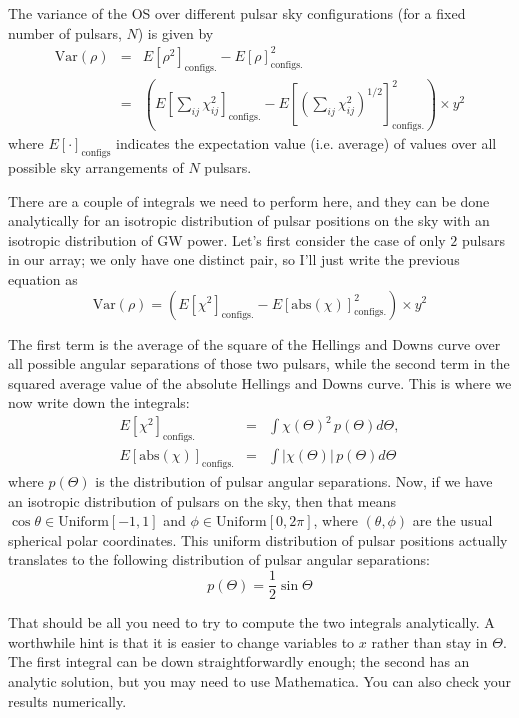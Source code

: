 \documentclass[12pt,letterpaper]{article}
\begin{document}
The variance of the OS over different pulsar sky configurations (for a fixed number of pulsars, $N$) is given by
%
\begin{eqnarray}
\mathrm{Var}(\rho) &=& E\left[\rho^2\right]_\mathrm{configs.} - E\left[\rho\right]^2_\mathrm{configs.} \nonumber\\
&=& \left(E\left[\sum_{ij} \chi_{ij}^2\right]_\mathrm{configs.} - E\left[\left(\sum_{ij} \chi_{ij}^2\right)^{1/2}\right]^2_\mathrm{configs.}\right) \times y^2
\end{eqnarray}
%
where $E[\cdot]_\mathrm{configs}$ indicates the expectation value (i.e. average) of values over all possible sky arrangements of $N$ pulsars. 

There are a couple of integrals we need to perform here, and they can be done analytically for an isotropic distribution of pulsar positions on the sky with an isotropic distribution of GW power. Let's first consider the case of only $2$ pulsars in our array; we only have one distinct pair, so I'll just write the previous equation as
%
\begin{equation}
\mathrm{Var}(\rho) = (E[\chi^2]_\mathrm{configs.} - E[\mathrm{abs}(\chi)]^2_\mathrm{configs.}) \times y^2
\end{equation}

The first term is the average of the square of the Hellings and Downs curve over all possible angular separations of those two pulsars, while the second term in the squared average value of the absolute Hellings and Downs curve. This is where we now write down the integrals:
%
\begin{eqnarray}
E[\chi^2]_\mathrm{configs.} &=& \int \chi(\Theta)^2 \, p(\Theta)d\Theta, \nonumber\\
E[\mathrm{abs}(\chi)]_\mathrm{configs.} &=& \int | \chi(\Theta) | \, p(\Theta)d\Theta
\end{eqnarray}
%
where $p(\Theta)$ is the distribution of pulsar angular separations. Now, if we have an isotropic distribution of pulsars on the sky, then that means $\cos\theta \in \mathrm{Uniform}[-1,1]$ and $\phi \in \mathrm{Uniform}[0,2\pi]$, where $(\theta,\phi)$ are the usual spherical polar coordinates. This uniform distribution of pulsar positions actually translates to the following distribution of pulsar angular separations:
%
\begin{equation}
p(\Theta) = \frac{1}{2}\sin\Theta
\end{equation}

That should be all you need to try to compute the two integrals analytically. A worthwhile hint is that it is easier to change variables to $x$ rather than stay in $\Theta$. The first integral can be down straightforwardly enough; the second has an analytic solution, but you may need to use Mathematica. You can also check your results numerically.

%
%
\end{document}
